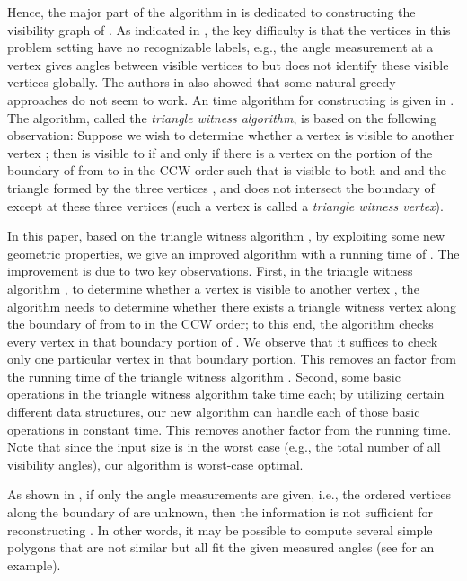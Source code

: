 \documentclass[11pt]{article}
\begin{document}
Hence, the major part of the algorithm in \cite{ref:DisserRe10} is
dedicated to constructing the visibility graph  of .
As indicated in \cite{ref:DisserRe10}, the key difficulty 
is that the vertices in this
problem setting have no recognizable labels, e.g., the angle
measurement at a vertex  gives angles between visible vertices to
 but does not identify these visible vertices globally. 
The authors in \cite{ref:DisserRe10} also showed that some natural greedy
approaches do not seem to work. An  time algorithm for
constructing  is given in \cite{ref:DisserRe10}. The algorithm, 
called the {\em triangle witness algorithm}, is based
on the following observation: Suppose we wish to determine whether a
vertex  is visible to another vertex ; then  is
visible to  if and only if there is a vertex  on the portion of
the boundary of  from  to  in the CCW order such
that  is visible to both  and  and the triangle formed
by the three vertices , and  does not intersect the
boundary of 
except at these three vertices (such a vertex  is called a {\em triangle
witness vertex}). 

In this paper, based on the triangle witness algorithm
\cite{ref:DisserRe10}, by exploiting some new geometric properties, we
give an improved algorithm with a running time of . The 
improvement is due to two key observations. First, in the triangle
witness algorithm \cite{ref:DisserRe10}, to determine whether a vertex
 is visible to another vertex , the algorithm needs to
determine whether there exists a triangle witness vertex along the
boundary of  from  to  in the CCW order; to this
end, the algorithm checks every vertex in that boundary portion of 
. We observe that it suffices to check only one particular vertex in that
boundary portion. This removes an  factor from the running time of
the triangle witness algorithm \cite{ref:DisserRe10}. Second, some
basic operations in the triangle witness algorithm
\cite{ref:DisserRe10} take  time each; by utilizing certain
different  
data structures, our new algorithm can handle each of those
basic operations in constant time. 
This removes another  factor from the running time. Note that
since the input size is  in the worst case (e.g., the
total number of all visibility angles), our algorithm is worst-case optimal.  

As shown in \cite{ref:DisserRe10}, if only the angle measurements are
given, i.e., the ordered vertices along the
boundary of  are unknown, then the information is not sufficient for 
reconstructing . In other words, it may be possible to compute several simple
polygons that are not similar but all fit the given measured angles (see
\cite{ref:DisserRe10} for an example). 
\end{document}
